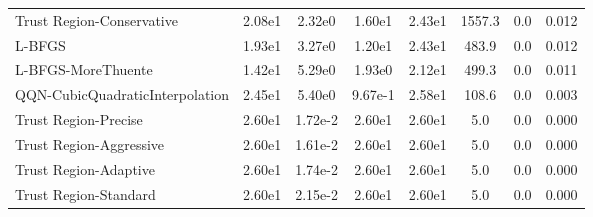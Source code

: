 \documentclass{article}
\begin{document}
\begin{table}[htbp]
{\begin{tabular}{p{2.5cm}*{7}{c}}
Trust Region-Conservative & 2.08e1 & 2.32e0 & 1.60e1 & 2.43e1 & 1557.3 & 0.0 & 0.012 \\
L-BFGS & 1.93e1 & 3.27e0 & 1.20e1 & 2.43e1 & 483.9 & 0.0 & 0.012 \\
L-BFGS-MoreThuente & 1.42e1 & 5.29e0 & 1.93e0 & 2.12e1 & 499.3 & 0.0 & 0.011 \\
QQN-CubicQuadraticInterpolation & 2.45e1 & 5.40e0 & 9.67e-1 & 2.58e1 & 108.6 & 0.0 & 0.003 \\
Trust Region-Precise & 2.60e1 & 1.72e-2 & 2.60e1 & 2.60e1 & 5.0 & 0.0 & 0.000 \\
Trust Region-Aggressive & 2.60e1 & 1.61e-2 & 2.60e1 & 2.60e1 & 5.0 & 0.0 & 0.000 \\
Trust Region-Adaptive & 2.60e1 & 1.74e-2 & 2.60e1 & 2.60e1 & 5.0 & 0.0 & 0.000 \\
Trust Region-Standard & 2.60e1 & 2.15e-2 & 2.60e1 & 2.60e1 & 5.0 & 0.0 & 0.000 \\
\bottomrule
\end{tabular}
}
\end{table}
\end{document}
